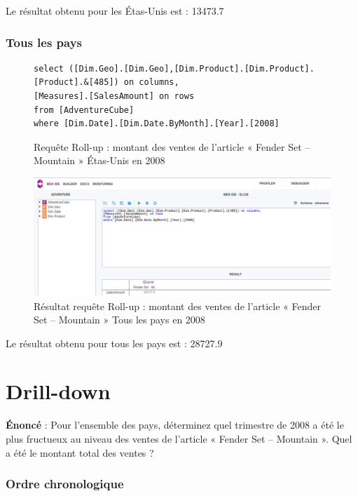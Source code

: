 Le résultat obtenu pour les Étas-Unis est : 13473.7

\subsubsection*{Tous les pays}

\begin{figure}[H]
\centering
\begin{lstlisting}
select ([Dim.Geo].[Dim.Geo],[Dim.Product].[Dim.Product].[Product].&[485]) on columns,
[Measures].[SalesAmount] on rows
from [AdventureCube]
where [Dim.Date].[Dim.Date.ByMonth].[Year].[2008]
\end{lstlisting}
\caption{Requête Roll-up : montant des ventes de l'article « Fender Set – Mountain » Étas-Unis en 2008}
\label{lst:reqRollUpUS}
\end{figure}

\begin{figure}[H]
    \centering
    \includegraphics[width=1\linewidth, fbox]{img/requeteRollUpPays.png}
    \caption{Résultat requête Roll-up : montant des ventes de l'article « Fender Set – Mountain » Tous les pays en 2008}
    \label{reqRollUpResultPays}
\end{figure}

Le résultat obtenu pour tous les pays est : 28727.9

\section{Drill-down}

\textbf{Énoncé} : Pour l’ensemble des pays, déterminez quel trimestre de 2008 a été le plus fructueux au niveau des ventes de l’article « Fender Set – Mountain ». Quel a été le montant total des ventes ?

\subsubsection*{Ordre chronologique}

